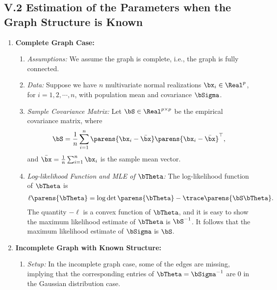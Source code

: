 \documentclass[12pt]{article}
\begin{document}
\subsection*{V.2 Estimation of the Parameters when the Graph Structure is Known}

\begin{enumerate}[label=\textbf{\arabic*.}]

	\item \textbf{Complete Graph Case:} 
	\begin{enumerate}
		\item \textit{Assumptions:} We assume the graph is complete, i.e., the graph is fully connected. 
		
		\item \textit{Data:} Suppose we have $n$ multivariate normal realizations $\bx_i \in \Real^p$, for $i = 1, 2, \cdots, n$, with population mean and covariance $\bSigma$. 
		
		\item \textit{Sample Covariance Matrix:} Let $\bS \in \Real^{p \times p}$ be the empirical covariance matrix, where 
		\begin{align}
			\bS = \frac{1}{n} \sum_{i=1}^n \parens{\bx_i - \bar{\bx}} \parens{\bx_i - \bar{\bx}}^\top, 
		\end{align} 
		and $\bar{\bx} = \frac{1}{n} \sum_{i=1}^n \bx_i$ is the sample mean vector. 
		
		\item \textit{Log-likelihood Function and MLE of $\bTheta$:} The log-likelihood function of $\bTheta$ is 
		\begin{align}
			\ell \parens{\bTheta} = \log \det \parens{\bTheta} - \trace \parens{\bS \bTheta}. 
		\end{align}
		The quantity $-\ell$ is a convex function of $\bTheta$, and it is easy to show the maximum likelihood estimate of $\bTheta$ is $\bS^{-1}$. It follows that the maximum likelihood estimate of $\bSigma$ is $\bS$. 
		
	\end{enumerate}
	
	\item \textbf{Incomplete Graph with Known Structure:} 
	\begin{enumerate}
		\item \textit{Setup:} In the incomplete graph case, some of the edges are missing, implying that the corresponding entries of $\bTheta = \bSigma^{-1}$ are 0 in the Gaussian distribution case. 
		

\end{enumerate}
\end{enumerate}
\end{document}
